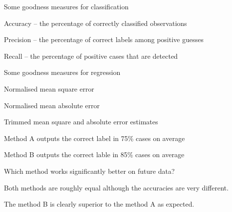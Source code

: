 \documentclass[landscape,footrule]{foils}
\begin{document}

Some goodness measures for classification
\begin{triangles}
\item Accuracy -- the percentage of correctly classified observations
\item Precision -- the percentage of correct labels among positive guesses 
\item Recall -- the percentage of positive cases that are detected
\end{triangles}
\vspace*{1cm}

Some goodness measures for regression
\begin{triangles}
\item Normalised mean square error
\item Normalised mean absolute error
\item Trimmed mean square and absolute error estimates  
\end{triangles}



\begin{triangles}
\item Method A outputs the correct label in 75\% cases on average
\item Method B outputs the correct lable in 85\% cases on average
\item Which method works significantly better on future data? 
\end{triangles} 






Both methods are roughly equal although the accuracies are very different. 



The method B is clearly superior to the method A as expected. 
\end{document}
